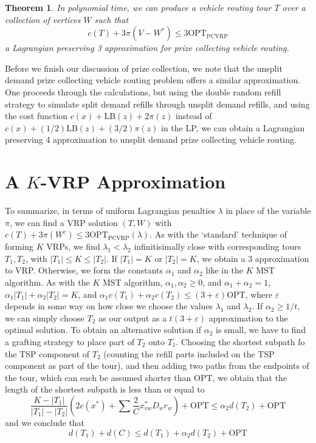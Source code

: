 \documentclass{article}
\theoremstyle{plain}
\theoremstyle{plain}
\newtheorem{theorem}{Theorem}
\begin{document}
\begin{theorem}
    In polynomial time, we can produce a vehicle routing tour $T$ over a collection of vertices $W$ such that
    \[ c(T) + 3\pi(V - W^*) \leq 3 \text{OPT}_{\text{PCVRP}} \]
    a Lagrangian preserving 3 approximation for prize collecting vehicle routing.
\end{theorem}

Before we finish our discussion of prize collection, we note that the unsplit demand prize collecting vehicle routing problem offers a similar approximation. One proceeds through the calculations, but using the double random refill strategy to simulate split demand refills through unsplit demand refills, and using the cost function $c(x) + \text{LB}(z) + 2 \pi(z)$ instead of $c(x) + (1/2) \text{LB}(z) + (3/2) \pi(z)$ in the LP, we can obtain a Lagrangian preserving 4 approximation to unsplit demand prize collecting vehicle routing.


\section{A $K$-VRP Approximation}

To summarize, in terms of uniform Lagrangian penalties $\lambda$ in place of the variable $\pi$, we can find a VRP solution $(T,W)$ with $c(T) + 3 \pi(W^c) \leq 3 \text{OPT}_{\text{PCVRP}}(\lambda)$. As with the `standard' technique of forming $K$ VRPs, we find $\lambda_1 < \lambda_2$ infinitisimally close with corresponding tours $T_1,T_2$, with $|T_1| \leq K \leq |T_2|$. If $|T_1| = K$ or $|T_2| = K$, we obtain a $3$ approximation to VRP. Otherwise, we form the constants $\alpha_1$ and $\alpha_2$ like in the $K$ MST algorithm. As with the $K$ MST algorithm, $\alpha_1, \alpha_2 \geq 0$, and $\alpha_1 + \alpha_2 = 1$, $\alpha_1 |T_1| + \alpha_2 |T_2| = K$, and $\alpha_1 c(T_1) + \alpha_2 c(T_2) \leq (3 + \varepsilon) \text{OPT}$, where $\varepsilon$ depends in some way on how close we choose the values $\lambda_1$ and $\lambda_2$. If $\alpha_2 \geq 1/t$, we can simply choose $T_2$ as our output as a $t(3 + \varepsilon)$ approximation to the optimal solution. To obtain an alternative solution if $\alpha_2$ is small, we have to find a grafting strategy to place part of $T_2$ onto $T_1$. Choosing the shortest subpath fo the TSP component of $T_2$ (counting the refill parts included on the TSP component as part of the tour), and then adding two paths from the endpoints of the tour, which can each be assumed shorter than $\text{OPT}$, we obtain that the length of the shortest subpath is less than or equal to
%
\[ \frac{K - |T_1|}{|T_1| - |T_2|} (2 c(x^*) + \sum \frac{2}{C} x^*_{vw} D_wr_w) + \text{OPT} \leq \alpha_2 d(T_2) + \text{OPT} \]
%
and we conclude that
%
\[ d(T_1) + d(C) \leq d(T_1) + \alpha_2 d(T_2) + \text{OPT} \]
\end{document}
